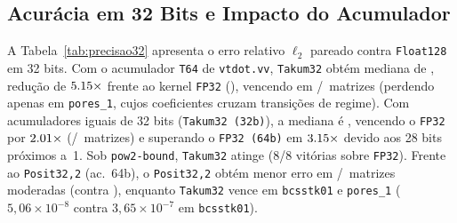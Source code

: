 \documentclass[conference]{IEEEtran}
\begin{document}
\subsection{Acur\'acia em 32 Bits e Impacto do Acumulador}
A Tabela~\ref{tab:precisao32} apresenta o erro relativo $\ell_2$ pareado contra \texttt{Float128} em 32 bits. Com o acumulador \texttt{T64} de \texttt{vtdot.vv}, \texttt{Takum32} obt\'em mediana de \MedTakumTrinta, redu\c{c}\~ao de $5.15\times$ frente ao kernel \texttt{FP32} (\MedFPtrinta), vencendo em \ParTrintaFPTakumVence/\ParTrintaFPAmbos\ matrizes (perdendo apenas em \texttt{pores\_1}, cujos coeficientes cruzam transi\c{c}\~oes de regime). Com acumuladores iguais de 32 bits (\texttt{Takum32 (32b)}), a mediana \'e \MedTakumTrintaAcTrinta, vencendo o \texttt{FP32} por $2.01\times$ (\ParTrintaAcFPTakumVence/\ParTrintaAcFPAmbos\ matrizes) e superando o \texttt{FP32 (64b)} em $3.15\times$ devido aos 28 bits pr\'oximos a~1. Sob \texttt{pow2-bound}, \texttt{Takum32} atinge \MedTakumTrintaScaled (8/8 vit\'orias sobre \texttt{FP32}). Frente ao \texttt{Posit32,2} (ac.\ 64b), o \texttt{Posit32,2} obt\'em menor erro em \ParTrintaPositOutroVence/\ParTrintaPositAmbos\ matrizes moderadas (\MedPositTrinta contra \MedTakumTrinta), enquanto \texttt{Takum32} vence em \texttt{bcsstk01} e \texttt{pores\_1} ($5{,}06\times 10^{-8}$ contra $3{,}65\times 10^{-7}$ em \texttt{bcsstk01}).
\end{document}
